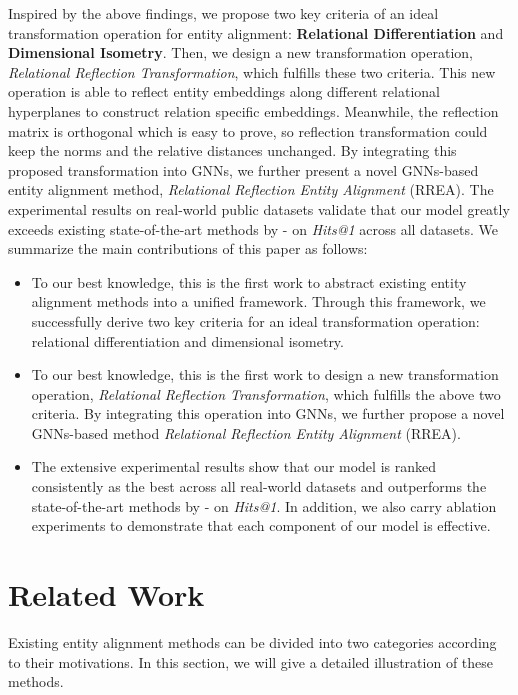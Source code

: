 \documentclass[sigconf,camera-ready]{acmart}
\begin{document}
Inspired by the above findings, we propose two key criteria of an ideal transformation operation for entity alignment: \textbf{Relational Differentiation} and \textbf{Dimensional Isometry}.
Then, we design a new transformation operation, \emph{Relational Reflection Transformation}, which fulfills these two criteria.
This new operation is able to reflect entity embeddings along different relational hyperplanes to construct relation specific embeddings.
Meanwhile, the reflection matrix is orthogonal which is easy to prove, so reflection transformation could keep the norms and the relative distances unchanged.
By integrating this proposed transformation into GNNs, we further present a novel GNNs-based entity alignment method, \emph{Relational Reflection Entity Alignment} (RREA).
The experimental results on real-world public datasets validate that our model greatly exceeds existing state-of-the-art methods by - on \emph{Hits@1} across all datasets.
We summarize the main contributions of this paper as follows:
\begin{itemize}
  \item To our best knowledge, this is the first work to abstract existing entity alignment methods into a unified framework.
      Through this framework, we successfully derive two key criteria for an ideal transformation operation: relational differentiation and dimensional isometry.
  \item To our best knowledge, this is the first work to design a new transformation operation, \emph{Relational Reflection Transformation}, which fulfills the above two criteria.
        By integrating this operation into GNNs, we further propose a novel GNNs-based method \emph{Relational Reflection Entity Alignment} (RREA).
  \item The extensive experimental results show that our model is ranked consistently as the best across all real-world datasets and outperforms the state-of-the-art methods by - on \emph{Hits@1}.
      In addition, we also carry ablation experiments to demonstrate that each component of our model is effective.

\end{itemize}

\section{Related Work}
\label{sec:RW}
Existing entity alignment methods can be divided into two categories according to their motivations.
In this section, we will give a detailed illustration of these methods.
\end{document}
